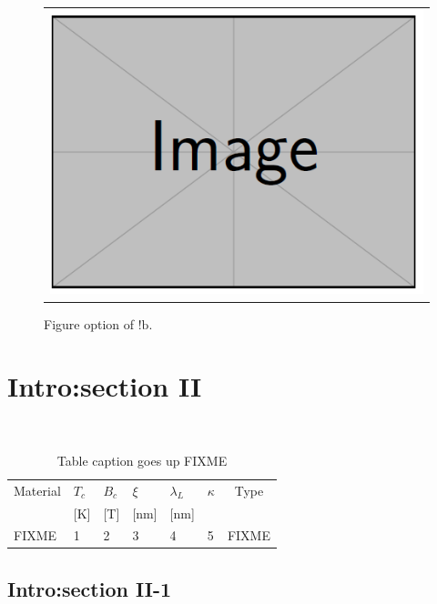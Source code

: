 \begin{figure}[!b]
	{
	\begin{center}
		\begin{tabular}{c}
			\includegraphics[width=0.9\linewidth]{dummy.png}
		\end{tabular}
	\end{center}
	}
	\caption[dummy image FIXME2 with long long long long long long long title]{Figure option of $!\text{b}$.}
\label{dummy_img2}
\end{figure}

\section{Intro:section II}
\lipsum[1-4]~\cite{anderson1964hard}

\begin{table}[htbp]
	\renewcommand{\arraystretch}{1.6}
	\setlength{\tabcolsep}{10pt}
	\caption{Table caption goes up FIXME}
	\label{tbl2_1}
	\centering
	\begin{tabular}{l l l l l l c}
	\hline\hline
	Material & $T_c$ & $B_c$& $\xi$ & $\lambda_L$ & $\kappa$ & Type \\
	\hfill & [K] & [T] & [nm] & [nm] & \hfill & \hfill \\
	\hline
	FIXME & 1 & 2 & 3 & 4 & 5 & FIXME \\
	\hline\hline
	\end{tabular}
\end{table}

\subsection{Intro:section II-1}
\lipsum[1-4]~\cite{anderson1964hard}

